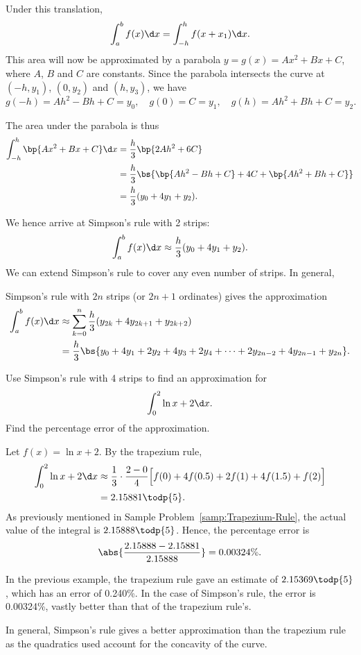 Under this translation, \[\int_a^b f(x) \d x = \int_{-h}^h f(x + x_1) \d x.\] This area will now be approximated by a parabola $y = g(x) = Ax^2 + Bx + C$, where $A$, $B$ and $C$ are constants. Since the parabola intersects the curve at $(-h, y_1)$, $(0, y_2)$ and $(h, y_3)$, we have \[g(-h) = Ah^2 - Bh + C = y_0, \quad g(0) = C = y_1, \quad g(h) = Ah^2 + Bh + C = y_2.\]

The area under the parabola is thus
\begin{align*}
    \int_{-h}^h \bp{Ax^2 + Bx + C} \d x &= \frac{h}{3} \bp{2Ah^2 + 6C}\\
    &= \frac{h}{3} \bs{\bp{Ah^2 - Bh + C} + 4C + \bp{Ah^2 + Bh + C}}\\
    &= \frac{h}{3} (y_0 + 4y_1 + y_2).
\end{align*}

We hence arrive at Simpson's rule with 2 strips: \[\int_a^b f(x) \d x \approx \frac{h}{3} (y_0 + 4y_1 + y_2).\] We can extend Simpson's rule to cover any even number of strips. In general,

\begin{recipe}
    Simpson's rule with $2n$ strips (or $2n+1$ ordinates) gives the approximation
    \begin{align*}
        \int_a^b f(x) \d x &\approx \sum_{k = 0}^n \frac{h}{3} (y_{2k} + 4y_{2k+1} + y_{2k+2})\\
        &= \frac{h}{3} \bs{y_0 + 4y_1 + 2y_2 + 4y_3 + 2y_4 + \dots + 2y_{2n-2} + 4y_{2n-1} + y_{2n}}.
    \end{align*}
\end{recipe}

\begin{sample}
    Use Simpson's rule with 4 strips to find an approximation for \[\int_0^2 \ln{x + 2} \d x.\] Find the percentage error of the approximation.
\end{sample}
\begin{sampans}
    Let $f(x) = \ln{x+2}$. By the trapezium rule,
    \begin{align*}
        \int_0^2 \ln{x + 2} \d x &\approx \frac{1}{3} \cdot \frac{2 - 0}{4} \Big[f(0) + 4f(0.5) + 2f(1) + 4f(1.5) + f(2)\Big] \\
        &= 2.15881 \todp{5}.
    \end{align*}
    As previously mentioned in Sample Problem~\ref{samp:Trapezium-Rule}, the actual value of the integral is $2.15888 \todp{5}$. Hence, the percentage error is \[\abs{\frac{2.15888 - 2.15881}{2.15888}} = 0.00324\%.\]
\end{sampans}

In the previous example, the trapezium rule gave an estimate of $2.15369 \todp{5}$, which has an error of 0.240\%. In the case of Simpson's rule, the error is 0.00324\%, vastly better than that of the trapezium rule's.

In general, Simpson's rule gives a better approximation than the trapezium rule as the quadratics used account for the concavity of the curve.